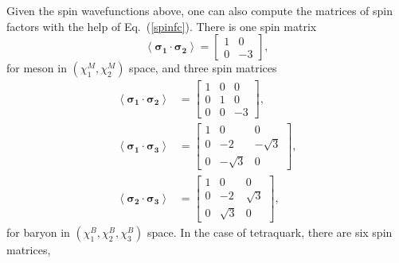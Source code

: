 \documentclass[12pt,prd,onecolumn,floatfix,nofootinbib]{revtex4}
\begin{document}
Given the spin wavefunctions above, one can also compute the matrices of
spin factors with the help of Eq.~(\ref{spinfc}). There is one spin matrix
\begin{equation}
\left\langle \boldsymbol{\sigma _{1}}\cdot \boldsymbol{\sigma _{2}}%
\right\rangle =%
\begin{bmatrix}
1 & 0 \\
0 & -3%
\end{bmatrix}%
,  \label{sfcM}
\end{equation}%
for meson in $(\chi _{1}^{M},\chi _{2}^{M})$ space, and three spin matrices
\begin{align}
\left\langle \boldsymbol{\sigma _{1}}\cdot \boldsymbol{\sigma _{2}}%
\right\rangle & =%
\begin{bmatrix}
1 & 0 & 0 \\
0 & 1 & 0 \\
0 & 0 & -3%
\end{bmatrix}%
, \\
\left\langle \boldsymbol{\sigma _{1}}\cdot \boldsymbol{\sigma _{3}}%
\right\rangle & =%
\begin{bmatrix}
1 & 0 & 0 \\
0 & -2 & -\sqrt{3} \\
0 & -\sqrt{3} & 0%
\end{bmatrix}%
, \\
\left\langle \boldsymbol{\sigma _{2}}\cdot \boldsymbol{\sigma _{3}}%
\right\rangle & =%
\begin{bmatrix}
1 & 0 & 0 \\
0 & -2 & \sqrt{3} \\
0 & \sqrt{3} & 0%
\end{bmatrix}%
,
\end{align}%
for baryon in $(\chi _{1}^{B},\chi _{2}^{B},\chi _{3}^{B})$ space. In the
case of tetraquark, there are six spin matrices,
\end{document}
